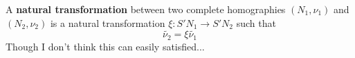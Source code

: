 \begin{defn}
    A \textbf{natural transformation} between two complete homographies $(N_1,\nu_1)$ and $(N_2,\nu_2)$ is a natural transformation $\xi : S'N_1\rightarrow S'N_2$ such that
    \begin{equation}
        \widetilde{\nu_2}= \xi\widetilde{\nu_1}
    \end{equation}
    Though I don't think this can easily satisfied...
\end{defn}


